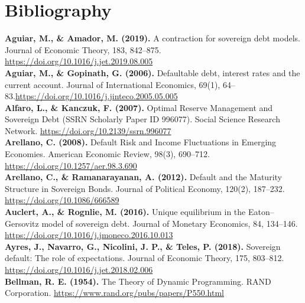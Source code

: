 \clearpage
{}
\setcounter{page}{5}
\chapter*{Bibliography}
\textbf{Aguiar, M., \& Amador, M. (2019).} A contraction for sovereign debt models. Journal of Economic Theory, 183, 842–875. \url{https://doi.org/10.1016/j.jet.2019.08.005}\\

\textbf{Aguiar, M., \& Gopinath, G. (2006).} Defaultable debt, interest rates and the current account. Journal of International Economics, 69(1), 64–83.\url{https://doi.org/10.1016/j.jinteco.2005.05.005}\\

\textbf{Alfaro, L., \& Kanczuk, F. (2007).} Optimal Reserve Management and Sovereign Debt (SSRN Scholarly Paper ID 996077). Social Science Research Network. \url{https://doi.org/10.2139/ssrn.996077}\\

\textbf{Arellano, C. (2008).} Default Risk and Income Fluctuations in Emerging Economies. American Economic Review, 98(3), 690–712. \url{https://doi.org/10.1257/aer.98.3.690}\\

\textbf{Arellano, C., \& Ramanarayanan, A. (2012).} Default and the Maturity Structure in Sovereign Bonds. Journal of Political Economy, 120(2), 187–232. \url{https://doi.org/10.1086/666589}\\

\textbf{Auclert, A., \& Rognlie, M. (2016).} Unique equilibrium in the Eaton–Gersovitz model of sovereign debt. Journal of Monetary Economics, 84, 134–146. \url{https://doi.org/10.1016/j.jmoneco.2016.10.013}\\

\textbf{Ayres, J., Navarro, G., Nicolini, J. P., \& Teles, P. (2018).} Sovereign default: The role of expectations. Journal of Economic Theory, 175, 803–812. \url{https://doi.org/10.1016/j.jet.2018.02.006}\\

\textbf{Bellman, R. E. (1954).} The Theory of Dynamic Programming. RAND Corporation. \url{https://www.rand.org/pubs/papers/P550.html}\\

